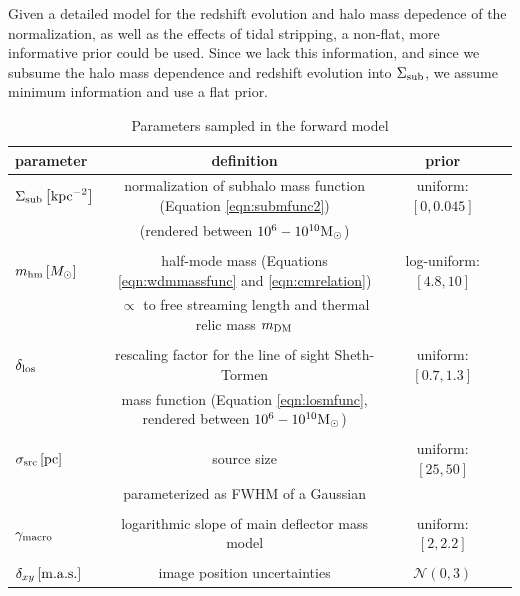 Given a detailed model for the redshift evolution and halo mass depedence of the normalization, as well as the effects of tidal stripping, a non-flat, more informative prior could be used. Since we lack this information, and since we subsume the halo mass dependence and redshift evolution into $\Sigma_{\rm{sub}}$, we assume minimum information and use a flat prior.
\begin{table}
	\centering
	\caption{Parameters sampled in the forward model}
	\label{tab:params}
	\begin{tabular}{lccr} %
		\hline
		parameter & definition & prior\\
		\hline 
		$\Sigma_{\rm{sub}} \left[\rm{kpc}^{-2}\right]$ & normalization of subhalo mass function (Equation \ref{eqn:submfunc2})&  uniform: $\left[0, 0.045\right] $\\&(rendered between $10^6-10^{10} {\rm{M}_{\odot}}$) & \\
		\\
		${m_{\rm{hm}}} \left[M_{\odot}\right]$ & half-mode mass (Equations \ref{eqn:wdmmassfunc} and \ref{eqn:cmrelation})& log-uniform: $\left[4.8, 10\right] $ \\
		&$\propto$ to free streaming length and thermal relic mass $m_{\rm{DM}}$ &\\
		\\
		$\delta_{\rm{los}}$ & rescaling factor for the line of sight Sheth-Tormen & uniform: $\left[0.7, 1.3\right]$ \\
		&mass function (Equation \ref{eqn:losmfunc}, rendered between $10^6-10^{10} {\rm{M}_{\odot}}$)&\\
		\\
		$\sigma_{\rm{src}} \left[\rm{pc}\right]$ & source size& uniform: $\left[25, 50\right]$\\
		& parameterized as FWHM of a Gaussian &\\
		\\
		$\gamma_{\rm{macro}}$ & logarithmic slope of main deflector mass model  & uniform: $\left[2, 2.2\right]$\\
		\\
		$\delta_{xy} \left[\rm{m.a.s.}\right]$ & image position uncertainties& ${\mathcal{N}}\left(0, 3\right)$\\
		\hline		
		
	\end{tabular}
\end{table}
